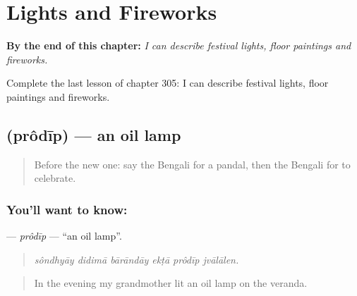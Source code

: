 
\chapter{Lights and Fireworks}
\label{ch:bn-lights-and-fireworks}

\begin{chapteropening}
\textbf{By the end of this chapter:} \emph{I can describe festival lights, floor paintings and fireworks.}

Complete the last lesson of chapter 305: I can describe festival lights, floor paintings and fireworks.
\end{chapteropening}

\section[\texorpdfstring{\bn{প্রদীপ} (prôdīp)}{প্রদীপ (prôdīp)}]{ (prôdīp) — an oil lamp}

\label{lesson:BN-C305-prodip}



\begin{quote}
Before the new one: say the Bengali for a pandal, then the Bengali for to celebrate.
\end{quote}

\subsection*{You'll want to know: }
\textbf{} — \emph{prôdīp} — \textquotedblleft{}an oil lamp\textquotedblright{}.

\begin{quote}
     
\end{quote}

\begin{quote}
\emph{sôndhyāy didimā bārāndāy ekṭā prôdīp jvālālen.}
\end{quote}

\begin{quote}
In the evening my grandmother lit an oil lamp on the veranda.
\end{quote}


